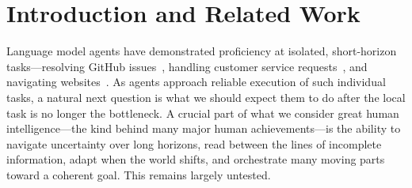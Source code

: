 \documentclass[10pt,letterpaper,twocolumn]{article}
\begin{document}



\section{Introduction and Related Work}

Language model agents have demonstrated proficiency at isolated, short-horizon tasks---resolving GitHub issues~\cite{jimenez2024swebench}, handling customer service requests~\cite{yao2024taubench}, and navigating websites~\cite{zhou2024webarena}. As agents approach reliable execution of such individual tasks, a natural next question is what we should expect them to do after the local task is no longer the bottleneck. A crucial part of what we consider great human intelligence---the kind behind many major human achievements---is the ability to navigate uncertainty over long horizons, read between the lines of incomplete information, adapt when the world shifts, and orchestrate many moving parts toward a coherent goal. This remains largely untested.
\end{document}
